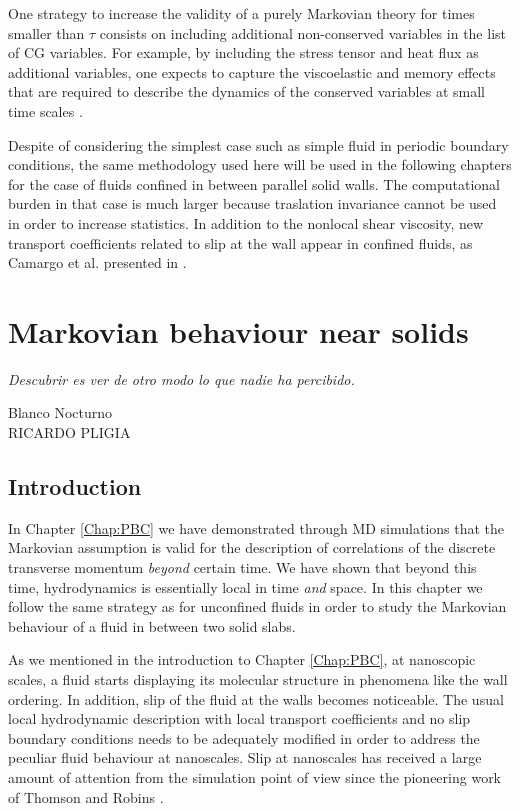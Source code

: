 \documentclass[b5paper,openright,11pt]{book}
\begin{document}
One strategy to increase the validity of a purely Markovian theory for
times   smaller  than   $\tau$   consists   on  including   additional
non-conserved variables in the list  of CG variables.  For example, by
including the stress tensor and heat flux as additional variables, one
expects  to  capture the  viscoelastic  and  memory effects  that  are
required to describe the dynamics  of the conserved variables at small
time scales \cite{Khayat1989,mryglod1995,Bryk2010}.

Despite of considering the simplest case such as  simple fluid  in periodic  boundary conditions, the  same methodology used here  will be  used in the following chapters for  the case  of fluids
confined in between parallel solid walls.  The computational burden in
that case is much larger  because traslation invariance cannot be used
in order to increase statistics.
In  addition   to  the   nonlocal  shear  viscosity,   new  transport
coefficients related to slip at the wall appear in confined fluids, as
Camargo et al. presented in \cite{CamargoBC2018}.


\chapter{Markovian behaviour near solids}\label{Chap:Walls}
\epigraph{\textit{Descubrir es ver de otro modo lo que nadie ha percibido.}}{Blanco Nocturno \\ RICARDO PLIGIA}
\section{Introduction}
In Chapter \ref{Chap:PBC} we have demonstrated
through MD simulations that the Markovian assumption
is  valid  for  the  description   of  correlations  of  the  discrete
transverse momentum \textit{beyond} certain  time.  We have shown that
beyond  this   time,  hydrodynamics  is  essentially   local  in  time
\textit{and} space.  
In this chapter we follow the same strategy as for unconfined fluids in order to study the Markovian behaviour of a fluid in between two solid slabs. 


As we mentioned in the introduction to Chapter \ref{Chap:PBC}, at nanoscopic scales,  a fluid
starts displaying its  molecular structure in phenomena  like the wall
ordering.   In  addition, slip  of  the  fluid  at the  walls  becomes
noticeable.   The  usual  local hydrodynamic  description  with  local
transport coefficients  and no  slip boundary  conditions needs  to be
adequately modified in  order to address the  peculiar fluid behaviour
at  nanoscales. Slip  at nanoscales  has  received a  large amount  of
attention from the simulation point  of view since the pioneering work
of Thomson and Robins \cite{Thompson1990,Koplik1995,Troian1997}.
\end{document}
